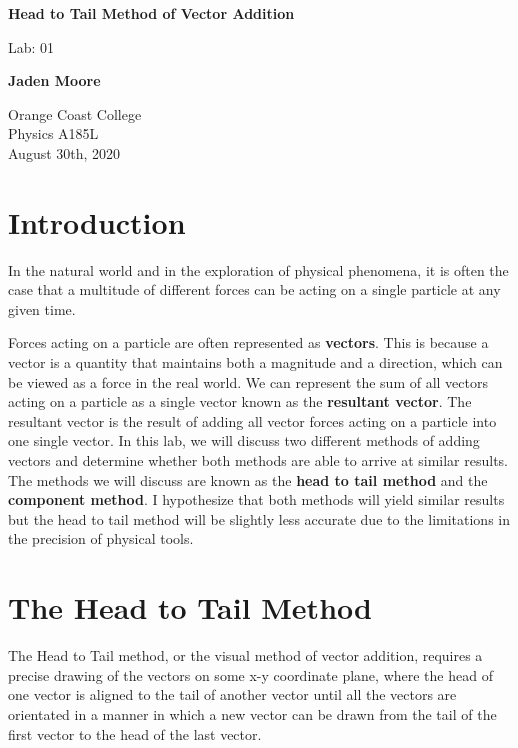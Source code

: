 \documentclass[12pt]{article}
\begin{document}
\begin{titlepage}
    \begin{center}
        \vspace*{1cm}
        \textbf{Head to Tail Method of Vector Addition}

        \vspace{0.5cm}
        Lab: 01

        \vspace{1cm}

        \textbf{Jaden Moore}

        \vfill

        Orange Coast College\\
        Physics A185L\\
        August 30th, 2020

    \end{center}
\end{titlepage}

\pagestyle{fancy}
\fancyhf{}
\setlength{\headheight}{15pt}
\cfoot{\thepage}

\section{Introduction}

In the natural world and in the exploration of physical phenomena, it is often the case that a multitude of different forces can be acting on a single particle at any given time.

Forces acting on a particle are often represented as \textbf{vectors}. This is because a vector is a quantity that maintains both a magnitude and a direction, which can be viewed as a force in the real world. We can represent the sum of all vectors acting on a particle as a single vector known as the \textbf{resultant vector}. The resultant vector is the result of adding all vector forces acting on a particle into one single vector. In this lab, we will discuss two different methods of adding vectors and determine whether both methods are able to arrive at similar results. The methods we will discuss are known as the \textbf{head to tail method} and the \textbf{component method}. I hypothesize that both methods will yield similar results but the head to tail method will be slightly less accurate due to the limitations in the precision of physical tools.

\section{The Head to Tail Method}
The Head to Tail method, or the visual method of vector addition, requires a precise drawing of the vectors on some x-y coordinate plane, where the head of one vector is aligned to the tail of another vector until all the vectors are orientated in a manner in which a new vector can be drawn from the tail of the first vector to the head of the last vector.
\end{document}
